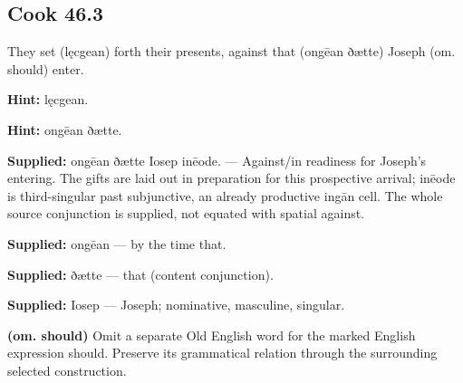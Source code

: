 \par\begin{minipage}{\linewidth}\raggedright
\subsection*{Cook 46.3}

They set (lęcgean) forth their presents, against that (ongēan ðætte) Joseph (om. should) enter.

\textbf{Hint:} lęcgean.

\textbf{Hint:} ongēan ðætte.

\end{minipage}\par\addvspace{4pt}

\textbf{Supplied:} ongēan ðætte Iosep inēode. — Against/\allowbreak{}in readiness for Joseph’s entering. The gifts are laid out in preparation for this prospective arrival; inēode is third-singular past subjunctive, an already productive ingān cell. The whole source conjunction is supplied, not equated with spatial against.

\textbf{Supplied:} ongēan — by the time that.

\textbf{Supplied:} ðætte — that (content conjunction).

\textbf{Supplied:} Iosep — Joseph; nominative, masculine, singular.

\textbf{(om. should)} Omit a separate Old English word for the marked English expression should. Preserve its grammatical relation through the surrounding selected construction.

